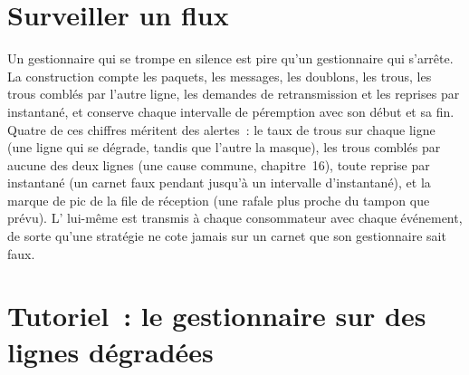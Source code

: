 \section{Surveiller un flux}

Un gestionnaire qui se trompe en silence est pire qu'un gestionnaire qui s'arrête. La construction compte les paquets, les messages, les doublons, les trous, les trous
comblés par l'autre ligne, les demandes de retransmission et les reprises par instantané, et conserve chaque intervalle de péremption avec son début
et sa fin. Quatre de ces chiffres méritent des alertes~: le taux de trous sur chaque ligne (une ligne qui se dégrade, tandis que l'autre la masque), les trous
comblés par aucune des deux lignes (une cause commune, chapitre~16), toute reprise par instantané (un carnet faux pendant jusqu'à un
intervalle d'instantané), et la marque de pic de la file de réception (une rafale plus proche du tampon que prévu). L' lui-même est transmis à
chaque consommateur avec chaque événement, de sorte qu'une stratégie ne cote jamais sur un carnet que son gestionnaire sait faux.

\section{Tutoriel~: le gestionnaire sur des lignes dégradées}\label{tut:ll:the-feed-handler:tut}

